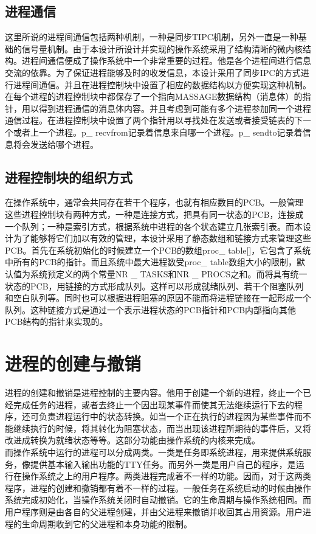 \documentclass[UTF8,nofonts,cs4size]{ctexrep}
\begin{document}
\subsection{进程通信}
这里所说的进程间通信包括两种机制，一种是同步TIPC机制，另外一直是一种基础的信号量机制。由于本设计所设计并实现的操作系统采用了结构清晰的微内核结构。进程间通信便成了操作系统中一个非常重要的过程。他是各个进程间进行信息交流的依靠。为了保证进程能够及时的收发信息，本设计采用了同步IPC的方式进行进程间通信。并且在进程控制块中设置了相应的数据结构以方便实现这种机制。在每个进程的进程控制块中都保存了一个指向MASSAGE数据结构（消息体）的指针，用以得到进程通信的消息体内容。并且考虑到可能有多个进程参加同一个进程通信过程。在进程控制块中设置了两个指针用以寻找处在发送或者接受链表的下一个或者上一个进程。p\_ recvfrom记录着信息来自哪一个进程。p\_ sendto记录着信息将会发送给哪个进程。
\subsection{进程控制块的组织方式}
在操作系统中，通常会共同存在若干个程序，也就有相应数目的PCB。一般管理这些进程控制块有两种方式，一种是连接方式，把具有同一状态的PCB，连接成一个队列；一种是索引方式，根据系统中进程的各个状态建立几张索引表。而本设计为了能够将它们加以有效的管理，本设计采用了静态数组和链接方式来管理这些PCB。首先在系统初始化的时候建立一个PCB的数组proc\_ table[]，它包含了系统中所有的PCB的指针。而且系统中最大进程数受proc\_ table数组大小的限制，默认值为系统预定义的两个常量NR \_ TASKS和NR \_  PROCS之和。而将具有统一状态的PCB，用链接的方式形成队列。这样可以形成就绪队列、若干个阻塞队列和空白队列等。同时也可以根据进程阻塞的原因不能而将进程链接在一起形成一个队列。这种链接方式是通过一个表示进程状态的PCB指针和PCB内部指向其他PCB结构的指针来实现的。
\section{进程的创建与撤销}
进程的创建和撤销是进程控制的主要内容。他用于创建一个新的进程，终止一个已经完成任务的进程，或者去终止一个因出现某事件而使其无法继续运行下去的程序，还可负责进程运行中的状态转换。如当一个正在执行的进程因为某些事件而不能继续执行的时候，将其转化为阻塞状态，而当出现该进程所期待的事件后，又将改进成转换为就绪状态等等。这部分功能由操作系统的内核来完成。
\\
\indent  而操作系统中运行的进程可以分成两类。一类是任务即系统进程，用来提供系统服务，像提供基本输入输出功能的TTY任务。而另外一类是用户自己的程序，是运行在操作系统之上的用户程序。两类进程完成着不一样的功能。因而，对于这两类程序，进程的创建和撤销都有着不一样的过程。一般任务在系统启动的时候由操作系统完成初始化，当操作系统关闭时自动撤销。它的生命周期与操作系统相同。而用户程序则是由各自的父进程创建，并由父进程来撤销并收回其占用资源。用户进程的生命周期收到它的父进程和本身功能的限制。
\end{document}
